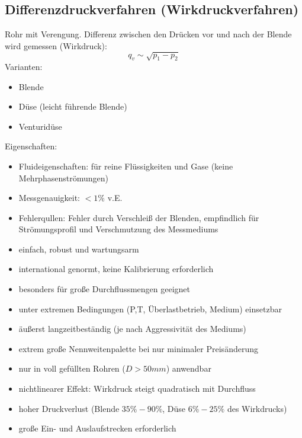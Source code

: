 \subsection{Differenzdruckverfahren (Wirkdruckverfahren)}
Rohr mit Verengung. Differenz zwischen den Drücken vor und nach der Blende wird gemessen (Wirkdruck):
$$q_v\sim \sqrt{p_1-p_2}$$
Varianten:
\begin{itemize}
\item Blende
\item Düse (leicht führende Blende)
\item Venturidüse
\end{itemize}
Eigenschaften:
\begin{itemize}
\item Fluideigenschaften: für reine Flüssigkeiten und Gase (keine Mehrphasenströmungen)
\item Messgenauigkeit: $<1\%$ v.E.
\item Fehlerqullen: Fehler durch Verschleiß der Blenden, empfindlich für Strömungsprofil und Verschmutzung des Messmediums
\end{itemize}
\begin{itemize}[label=$+$]
\item einfach, robust und wartungsarm
\item international genormt, keine Kalibrierung erforderlich
\item besonders für große Durchflussmengen geeignet
\item unter extremen Bedingungen (P,T, Überlastbetrieb, Medium) einsetzbar
\item äußerst langzeitbeständig (je nach Aggressivität des Mediums)
\item extrem große Nennweitenpalette bei nur minimaler Preisänderung
\end{itemize}
\begin{itemize}[label=$-$]
\item nur in voll gefüllten Rohren ($D > 50\unit{mm}$) anwendbar
\item nichtlinearer Effekt: Wirkdruck steigt quadratisch mit Durchfluss
\item hoher Druckverlust (Blende $35\%-90\%$, Düse $6\%-25\%$ des Wirkdrucks)
\item große Ein- und Auslaufstrecken erforderlich
\end{itemize}

